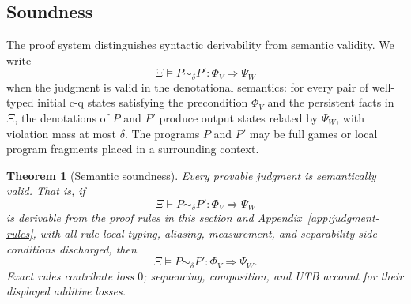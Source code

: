 \documentclass[conference,compsoc]{IEEEtran}
\newtheorem{theorem}{Theorem}
\begin{document}

\subsection{Soundness}

The proof system distinguishes syntactic derivability from semantic validity.
We write
\[
\Xi
\models P\sim_{\delta}P':
\Phi_V\Longrightarrow\Psi_W
\]
when the judgment is valid in the denotational semantics: for every pair of
well-typed initial c-q states satisfying the precondition \(\Phi_V\) and the
persistent facts in \(\Xi\), the denotations of \(P\) and \(P'\) produce output
states related by \(\Psi_W\), with violation mass at most \(\delta\). The
programs \(P\) and \(P'\) may be full games or local program fragments placed in
a surrounding context.

\begin{theorem}[Semantic soundness]
\label{thm:rule-soundness}
Every provable judgment is semantically valid. That is, if
\[
\Xi
\vdash P\sim_{\delta}P':
\Phi_V\Longrightarrow\Psi_W
\]
is derivable from the proof rules in this section and
Appendix~\ref{app:judgment-rules}, with all rule-local typing, aliasing,
measurement, and separability side conditions discharged, then
\[
\Xi
\models P\sim_{\delta}P':
\Phi_V\Longrightarrow\Psi_W .
\]
Exact rules contribute loss \(0\); sequencing, composition, and \textsc{UTB}
account for their displayed additive losses.
\end{theorem}
\end{document}
